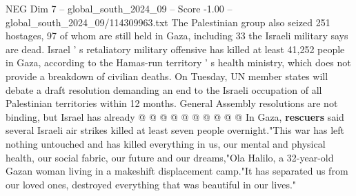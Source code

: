 \begin{textsample}{NEG Dim 7 – global\_south\_2024\_09 – Score -1.00 – global\_south\_2024\_09/114309963.txt}
The Palestinian group also seized 251 hostages, 97 of whom are still held in Gaza, including 33 the Israeli military says are dead.
Israel ' s retaliatory military offensive has killed at least 41,252 people in Gaza, according to the Hamas-run territory ' s health ministry, which does not provide a breakdown of civilian deaths.
On Tuesday, UN member states will debate a draft resolution demanding an end to the Israeli occupation of all Palestinian territories within 12 months.
General Assembly resolutions are not binding, but Israel has already @ @ @ @ @ @ @ @ @ @ In Gaza, \textbf{rescuers} said several Israeli air strikes killed at least seven people overnight."This war has left nothing untouched and has killed everything in us, our mental and physical health, our social fabric, our future and our dreams,"Ola Halilo, a 32-year-old Gazan woman living in a makeshift displacement camp."It has separated us from our loved ones, destroyed everything that was beautiful in our lives."

\end{textsample}
